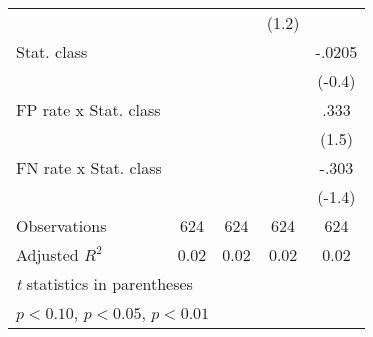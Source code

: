\begin{table}[htbp]
\begin{tabular}{l*{4}{c}}
                &                  &                  &    (1.2)         &                  \\
Stat. class     &                  &                  &                  &   -.0205         \\
                &                  &                  &                  &   (-0.4)         \\
FP rate x Stat. class&                  &                  &                  &     .333         \\
                &                  &                  &                  &    (1.5)         \\
FN rate x Stat. class&                  &                  &                  &    -.303         \\
                &                  &                  &                  &   (-1.4)         \\
\hline
Observations    &      624         &      624         &      624         &      624         \\
Adjusted \(R^{2}\)&     0.02         &     0.02         &     0.02         &     0.02         \\
\hline\hline
\multicolumn{5}{l}{\footnotesize \textit{t} statistics in parentheses}\\
\multicolumn{5}{l}{\footnotesize \sym{*} \(p<0.10\), \sym{**} \(p<0.05\), \sym{***} \(p<0.01\)}\\
\end{tabular}
\end{table}
